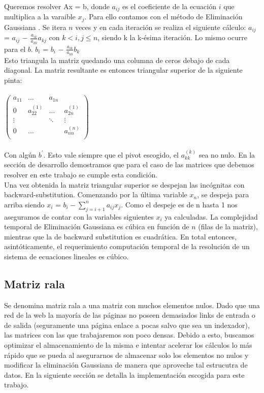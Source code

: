 Queremos resolver Ax = b, donde $a_{ij}$ es el coeficiente de la ecuación $i$ que multiplica a la varaible $x_{j}$. Para ello contamos con el método de Eliminación Gaussiana \cite{burden}. 
Se itera $n$ veces y en cada iteración se realiza el siguiente cálculo: 
$a_{ij}$ = $a_{ij}$ $-$ $\frac{a_{ik}}{a_{kk}} a_{kj}$  con $k < i,j \leq n$, siendo k la k-ésima iteración.
Lo mismo ocurre para el $b$. $b_{i}$ = $b_{i}$ $-$ $\frac{a_{ik}}{a_{kk}} b_{k}$ \\
Esto triangula la matriz quedando una columna de ceros debajo de cada diagonal. La matriz resultante es entonces triangular superior de la siguiente pinta: \\ \\

$\begin{pmatrix}
a_{11} & \dots & a_{1n} \\
0 & a_{22}^{(1)} & \dots & a_{2n}^(1) \\
\vdots &  & \ddots  & \vdots \\
0 & \dots & & a_{nn}^(n)       \\
\end{pmatrix}$ \\ \\

Con algún $b^{'}$. Esto vale siempre que el pivot escogido, el $a_{kk}^(k)$ sea no nulo. En la sección de desarrollo demostramos que para el caso de las matrices que debemos resolver en este trabajo se cumple esta condición.\\

Una vez obtenida la matriz triangular superior se despejan las incógnitas con backward-substitution. Comenzando por la última variable $x_{n}$, se despeja para arriba siendo $x_{i}$ = $b_{i} - \sum_{j=i+1}^{n} a_{ij}x_{j}$. Como el despeje es de n hasta 1 nos aseguramos de contar con la variables siguientes $x_{i}$ ya calculadas. 
La complejidad temporal de Eliminación Gaussiana es cúbica en función de $n$ (filas de la matriz), mientras que la de backward substitution es cuadrática. En total entonces, asintóticamente, el requerimiento computación temporal de la resolución de un sistema de ecuaciones lineales es cúbico.\\

\subsection{Matriz rala}

Se denomina matriz rala a una matriz con muchos elementos nulos. Dado que una red de la web la mayoría de las páginas no poseen demasiados links de entrada o de salida (seguramente una página enlace a pocas salvo que sea un indexador), las matrices con las que trabajaremos son poco densas. Debido a esto, buscamos optimizar el almacenamiento de la misma e intentar acelerar los cálculos lo más rápido que se pueda al asegurarnos de almacenar solo los elementos no nulos y modificar la eliminación Gaussiana de manera que aproveche tal estrucutra de datos. 
En la siguiente sección se detalla la implementación escogida para este trabajo.\\ \\

